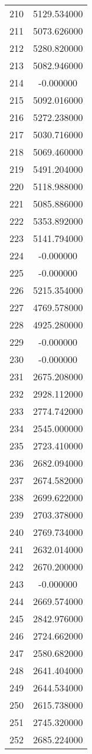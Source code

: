 \documentclass[12pt]{article}
\begin{document}
\begin{longtable}{@{}cc@{}}
210 & 5129.534000 \\
211 & 5073.626000 \\
212 & 5280.820000 \\
213 & 5082.946000 \\
214 & -0.000000 \\
215 & 5092.016000 \\
216 & 5272.238000 \\
217 & 5030.716000 \\
218 & 5069.460000 \\
219 & 5491.204000 \\
220 & 5118.988000 \\
221 & 5085.886000 \\
222 & 5353.892000 \\
223 & 5141.794000 \\
224 & -0.000000 \\
225 & -0.000000 \\
226 & 5215.354000 \\
227 & 4769.578000 \\
228 & 4925.280000 \\
229 & -0.000000 \\
230 & -0.000000 \\
231 & 2675.208000 \\
232 & 2928.112000 \\
233 & 2774.742000 \\
234 & 2545.000000 \\
235 & 2723.410000 \\
236 & 2682.094000 \\
237 & 2674.582000 \\
238 & 2699.622000 \\
239 & 2703.378000 \\
240 & 2769.734000 \\
241 & 2632.014000 \\
242 & 2670.200000 \\
243 & -0.000000 \\
244 & 2669.574000 \\
245 & 2842.976000 \\
246 & 2724.662000 \\
247 & 2580.682000 \\
248 & 2641.404000 \\
249 & 2644.534000 \\
250 & 2615.738000 \\
251 & 2745.320000 \\
252 & 2685.224000 \\

\end{longtable}
\end{document}

